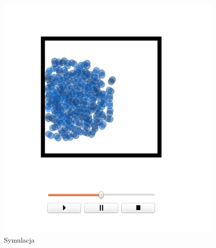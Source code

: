 \begin{minipage}{0.5\textwidth}
\begin{figure}[H]
 \begin{center}
  \includegraphics[width=\textwidth]{./rysunki/poczatek2}
 \end{center}
 \caption{Symulacja}
 \label{fig:poczatek2}
\end{figure}
\end{minipage}
~
